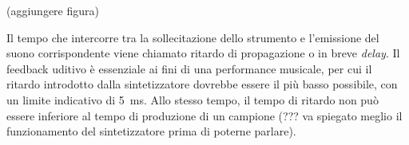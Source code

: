 (aggiungere figura)

Il tempo che intercorre tra la sollecitazione dello strumento e l'emissione del suono corrispondente viene chiamato ritardo di propagazione o in breve \textit{delay}.
Il feedback uditivo è essenziale ai fini di una performance musicale, per cui il ritardo introdotto dalla sintetizzatore
dovrebbe essere il più basso possibile, con un limite indicativo di \SI{5}{\milli\second}.
Allo stesso tempo, il tempo di ritardo non può essere inferiore al tempo di produzione di un campione (??? va spiegato meglio il funzionamento del sintetizzatore prima di poterne parlare).




